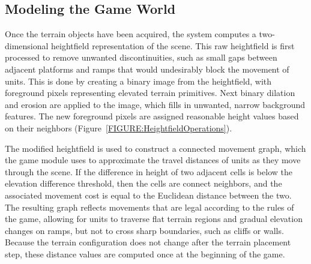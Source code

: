 \documentclass[review]{vgtc}                 %
\begin{document}

\subsection{Modeling the Game World }


Once the terrain objects have been acquired, the system computes a
two-dimensional heightfield representation of the scene.  This raw
heightfield is first processed to remove unwanted discontinuities,
such as small gaps between adjacent platforms and ramps that would
undesirably block the movement of units.  This is done by creating a
binary image from the heightfield, with foreground pixels representing
elevated terrain primitives.  Next binary dilation and erosion are
applied to the image, which fills in unwanted, narrow background
features.  The new foreground pixels are assigned reasonable height
values based on their neighbors (Figure~\ref{FIGURE:HeightfieldOperations}).

The modified heightfield is used to construct a connected movement
graph, which the game module uses to approximate the travel distances
of units as they move through the scene.  
If the difference in height of two adjacent cells is below the
elevation difference threshold, then the cells are connect neighbors,
and the associated movement cost is equal to the Euclidean distance
between the two. 
The
resulting graph reflects movements that are legal according to the
rules of the game, allowing for units to traverse flat terrain regions
and gradual elevation changes on ramps, but not to cross sharp
boundaries, such as cliffs or walls.  Because the terrain
configuration does not change after the terrain placement step, these
distance values are computed once at the beginning of the game.

\end{document}
